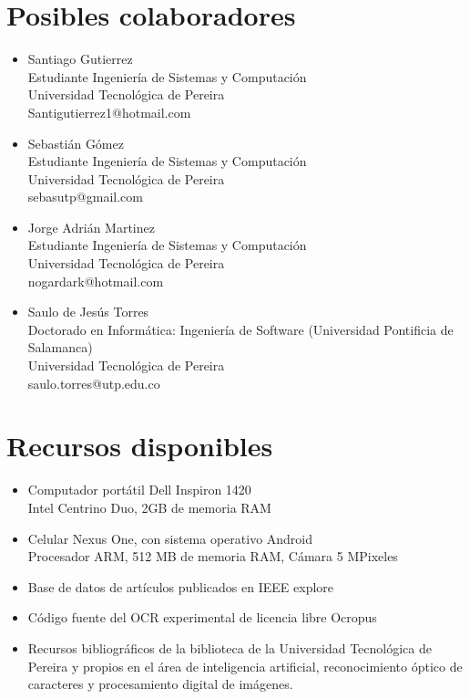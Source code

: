 \documentclass[a4paper, 11pt, oneside]{article}
\begin{document}
	\section{Posibles colaboradores}
	\begin{itemize}
   \item Santiago Gutierrez\\
Estudiante Ingeniería de Sistemas y Computación\\
Universidad Tecnológica de Pereira\\
Santigutierrez1@hotmail.com
   \item Sebastián Gómez\\
Estudiante Ingeniería de Sistemas y Computación\\
Universidad Tecnológica de Pereira\\
sebasutp@gmail.com
   \item Jorge Adrián Martinez\\
Estudiante Ingeniería de Sistemas y Computación\\
Universidad Tecnológica de Pereira\\
nogardark@hotmail.com
   \item Saulo de Jesús Torres\\
Doctorado en Informática: Ingeniería de Software (Universidad Pontificia de Salamanca)\\
Universidad Tecnológica de Pereira\\
saulo.torres@utp.edu.co
	\end{itemize}
	\clearpage
	
	\section{Recursos disponibles}
	\begin{itemize}
		\item Computador portátil Dell Inspiron 1420\\
			Intel Centrino Duo, 2GB de memoria RAM
		\item Celular Nexus One, con sistema operativo Android\\
			Procesador ARM, 512 MB de memoria RAM, Cámara 5 MPixeles
		\item Base de datos de artículos publicados en IEEE explore
		\item Código fuente del OCR experimental de licencia libre Ocropus
	            \item Recursos bibliográficos de la biblioteca de la Universidad Tecnológica de Pereira y propios en el área de inteligencia artificial, reconocimiento óptico de caracteres y procesamiento digital de imágenes.
	\end{itemize}
	\clearpage


\nocite{*}
\end{document}
